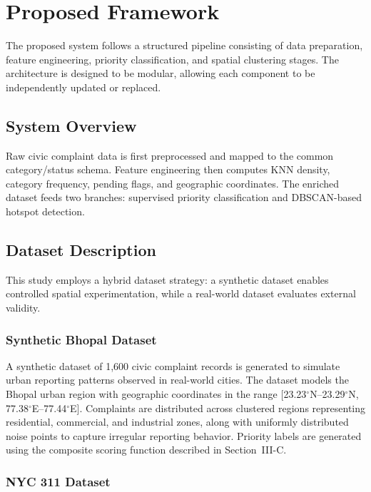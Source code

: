 \documentclass[conference]{IEEEtran}
\begin{document}
\section{Proposed Framework}

The proposed system follows a structured pipeline consisting of data preparation, feature engineering, priority classification, and spatial clustering stages. The architecture is designed to be modular, allowing each component to be independently updated or replaced.

\subsection{System Overview}

Raw civic complaint data is first preprocessed and mapped to the common category/status schema. Feature engineering then computes KNN density, category frequency, pending flags, and geographic coordinates. The enriched dataset feeds two branches: supervised priority classification and DBSCAN-based hotspot detection.

\subsection{Dataset Description}

This study employs a hybrid dataset strategy: a synthetic dataset enables controlled spatial experimentation, while a real-world dataset evaluates external validity.

\subsubsection{Synthetic Bhopal Dataset}

A synthetic dataset of 1,600 civic complaint records is generated to simulate urban reporting patterns observed in real-world cities. The dataset models the Bhopal urban region with geographic coordinates in the range [23.23$^{\circ}$N--23.29$^{\circ}$N, 77.38$^{\circ}$E--77.44$^{\circ}$E]. Complaints are distributed across clustered regions representing residential, commercial, and industrial zones, along with uniformly distributed noise points to capture irregular reporting behavior. Priority labels are generated using the composite scoring function described in Section~III-C.

\subsubsection{NYC 311 Dataset}
\end{document}
